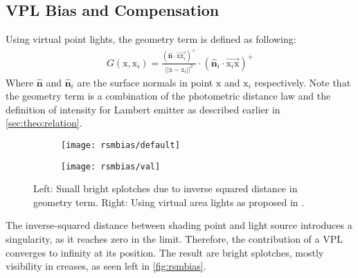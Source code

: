 \documentclass[thesis.tex]{subfiles}
\begin{document}
\subsection{VPL Bias and Compensation} \label{sec:fig:rsmbias}
Using virtual point lights, the geometry term is defined as following:
\begin{align}
G(\mathrm{x}, \mathrm{x}_i) = \frac{(\hat{\mathbf{n}} \cdot \overrightarrow{\mathrm{x}\mathrm{x}_i} )^+}{||\mathrm{x} - \mathrm{x}_i||^2} \cdot (\hat{\mathbf{n}}_i \cdot \overrightarrow{\mathrm{x}_i\mathrm{x}})^+
\end{align}
Where $\hat{\mathbf{n}}$ and $\hat{\mathbf{n}}_i$ are the surface normals in point $\mathrm{x}$ and $\mathrm{x}_i$ respectively.
Note that the geometry term is a combination of the photometric distance law and the definition of intensity for Lambert emitter as described earlier in \autoref{sec:theo:relation}. %
\\
\begin{figure}[h]
\centering
\begin{subfigure}[b]{0.48\textwidth}
	\texttt{[image: rsmbias/default]}
\end{subfigure}
\begin{subfigure}[b]{0.48\textwidth}
	\texttt{[image: rsmbias/val]}
\end{subfigure}
\caption{Left: Small bright splotches due to inverse squared distance in geometry term. Right: Using virtual area lights as proposed in \cite{bib:LightskinPaper}.}\label{fig:rsmbias}
\end{figure}
The inverse-squared distance between shading point and light source introduces a singularity, as it reaches zero in the limit.
Therefore, the contribution of a VPL converges to infinity at its position.
The result are bright splotches, mostly visibility in creases, as seen left in \autoref{fig:rsmbias}.
\end{document}
